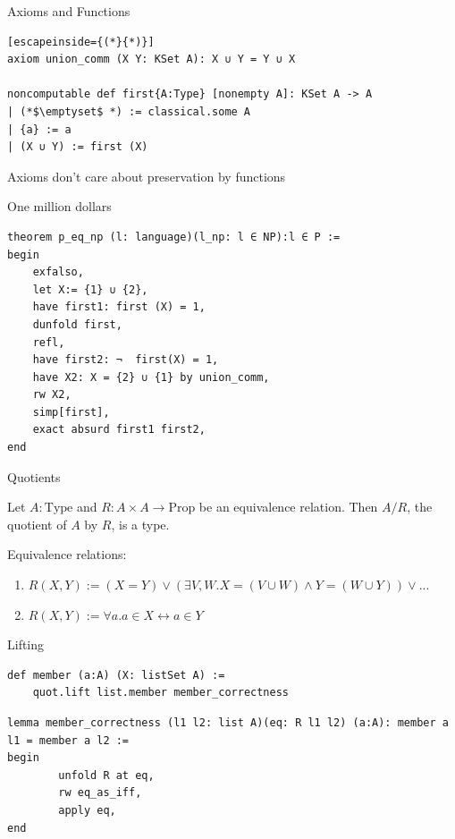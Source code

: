 \documentclass{beamer}
\begin{document}
    \begin{frame}[fragile]{Axioms and Functions}
        \begin{lstlisting}[escapeinside={(*}{*)}]
axiom union_comm (X Y: KSet A): X ∪ Y = Y ∪ X

noncomputable def first{A:Type} [nonempty A]: KSet A -> A
| (*$\emptyset$ *) := classical.some A
| {a} := a
| (X ∪ Y) := first (X)
    \end{lstlisting}
        \begin{block}{}
            Axioms don't care about preservation by functions
        \end{block}
    \end{frame}
    \begin{frame}[fragile]{One million dollars}
        \begin{lstlisting}
theorem p_eq_np (l: language)(l_np: l ∈ NP):l ∈ P :=
begin
    exfalso,
    let X:= {1} ∪ {2},
    have first1: first (X) = 1,
    dunfold first,
    refl,
    have first2: ¬  first(X) = 1,
    have X2: X = {2} ∪ {1} by union_comm,
    rw X2,
    simp[first],
    exact absurd first1 first2,
end
            \end{lstlisting}
    \end{frame}
    \begin{frame}{Quotients}
        \begin{definition}
            Let $A: \text{{Type}}$ and $R: A \times A \to \text{{Prop}}$ be an equivalence relation.
            Then $A/R$, the quotient of $A$ by $R$, is a type.
        \end{definition}
    \pause
    Equivalence relations:
    \begin{enumerate}[<+->]
        \item $R(X,Y) := (X = Y) \lor (\exists V, W. X= (V \cup W) \land Y = (W \cup Y)) \lor ...$
        \item $R(X,Y) := \forall a. a \in X \leftrightarrow a \in Y$
    \end{enumerate}

    \end{frame}
    \begin{frame}[fragile]{Lifting}
    \begin{lstlisting}
def member (a:A) (X: listSet A) := 
    quot.lift list.member member_correctness
    \end{lstlisting}

    \begin{lstlisting}
lemma member_correctness (l1 l2: list A)(eq: R l1 l2) (a:A): member a l1 = member a l2 :=
begin
        unfold R at eq,
        rw eq_as_iff,
        apply eq,
end
    \end{lstlisting}
    \end{frame}
\end{document}
